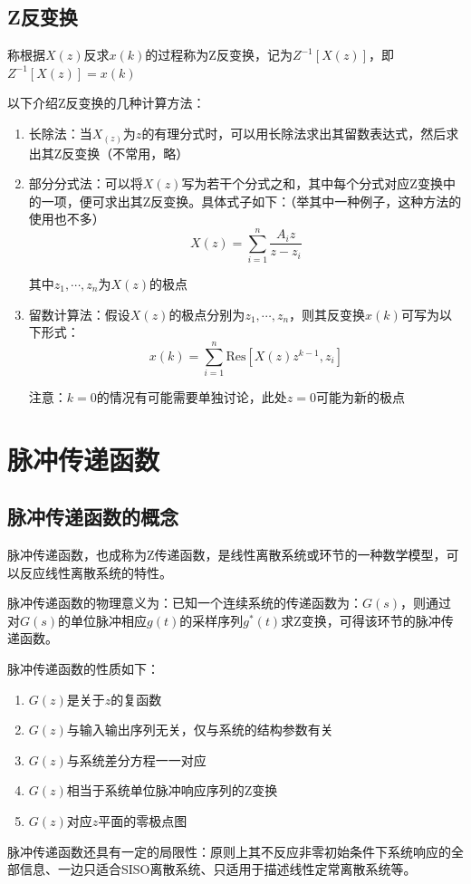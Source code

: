 \subsection{Z反变换}

\begin{definition}
    称根据$X(z)$反求$x(k)$的过程称为Z反变换，记为$Z^{-1}[X(z)]$，即$Z^{-1}[X(z)] = x(k)$
\end{definition}

以下介绍Z反变换的几种计算方法：

\begin{enumerate}
    \item 长除法：当$X_(z)$为$z$的有理分式时，可以用长除法求出其留数表达式，然后求出其Z反变换（不常用，略）
    \item 部分分式法：可以将$X(z)$写为若干个分式之和，其中每个分式对应Z变换中的一项，便可求出其Z反变换。具体式子如下：（举其中一种例子，这种方法的使用也不多）
    \begin{equation*}
        X(z) = \sum_{i=1}^n \frac{A_i z}{z-z_i}
    \end{equation*}

    其中$z_1,\cdots,z_n$为$X(z)$的极点
    \item 留数计算法：假设$X(z)$的极点分别为$z_1,\cdots,z_n$，则其反变换$x(k)$可写为以下形式：
    \begin{equation*}
        x(k) = \sum_{i=1}^n \text{Res}[X(z)z^{k-1},z_i]
    \end{equation*}

    注意：$k=0$的情况有可能需要单独讨论，此处$z=0$可能为新的极点
\end{enumerate}

\section{脉冲传递函数}

\subsection{脉冲传递函数的概念}
\begin{definition}
    脉冲传递函数，也成称为Z传递函数，是线性离散系统或环节的一种数学模型，可以反应线性离散系统的特性。

    脉冲传递函数的物理意义为：已知一个连续系统的传递函数为：$G(s)$，则通过对$G(s)$的单位脉冲相应$g(t)$的采样序列$g^* (t)$求Z变换，可得该环节的脉冲传递函数。

    脉冲传递函数的性质如下：
    \begin{enumerate}
        \item $G(z)$是关于$z$的复函数
        \item $G(z)$与输入输出序列无关，仅与系统的结构参数有关
        \item $G(z)$与系统差分方程一一对应
        \item $G(z)$相当于系统单位脉冲响应序列的Z变换
        \item $G(z)$对应$z$平面的零极点图
    \end{enumerate}

    脉冲传递函数还具有一定的局限性：原则上其不反应非零初始条件下系统响应的全部信息、一边只适合SISO离散系统、只适用于描述线性定常离散系统等。
\end{definition}

